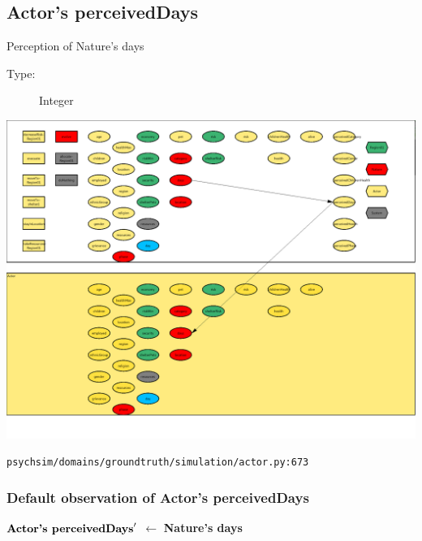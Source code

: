 \documentclass{article}%
\begin{document}
\subsection{Actor's perceivedDays}%
\label{subsec:Actor's perceivedDays}%
Perception of Nature's days%
\begin{description}%
\item[Type:]%
Integer%
\end{description}%
\includegraphics[width=\textwidth]{images/perceivedDaysOfActor.png}%
\begin{flushleft}%
\verb|psychsim/domains/groundtruth/simulation/actor.py:673|%
\end{flushleft}%
\subsubsection{Default observation of Actor's perceivedDays}%
\label{ssubsec:Default observation of Actor's perceivedDays}%
\begin{flushleft}%
$\mbox{\textbf{Actor's perceivedDays}} '$%
$\leftarrow$%
\textbf{Nature's days}%
\end{flushleft}

%
\end{document}
